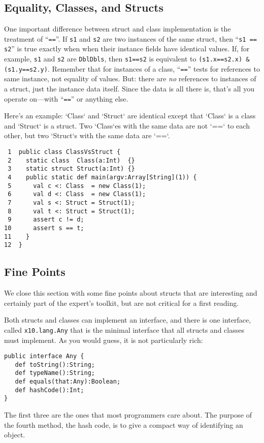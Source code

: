 \subsection{Equality, Classes, and Structs}

One important difference between struct and class
implementation is the treatment of ``{\tt ==}''.   If {\tt s1} and {\tt s2} are
two instances of the same struct, then ``{\tt s1 == s2}'' is true exactly when
when their instance fields have identical values.  If, for example, 
{\tt s1} and {\tt s2} are {\tt DblDbls}, then {\tt s1==s2}
is equivalent to {\tt (s1.x==s2.x) \& (s1.y==s2.y)}.  Remember that for
instances of a class, ``{\tt ==}'' tests for references to same instance,
not equality of values. But: there are {\em no} references to instances of a
struct, just the instance data itself.  Since the data is all there is, that's
all you operate on---with ``{\tt ==}'' or anything else.


Here's an example: \xcd`Class` and \xcd`Struct` are identical except that
\xcd`Class` is a class and \xcd`Struct` is a struct.  Two \xcd`Class`es with
the same data are not \xcd`==` to each other, but two \xcd`Struct`s with the
same data are \xcd`==`.
\begin{verbatim}
 1  public class ClassVsStruct {
 2    static class  Class(a:Int)  {}
 3    static struct Struct(a:Int) {}
 4    public static def main(argv:Array[String](1)) {
 5      val c <: Class  = new Class(1);
 6      val d <: Class  = new Class(1);
 7      val s <: Struct = Struct(1);
 8      val t <: Struct = Struct(1);
 9      assert c != d;
10      assert s == t;
11    }
12  }
\end{verbatim}

\subsection{Fine Points}

We close this section with some fine points about structs that are interesting
and certainly part of the expert's toolkit, but are not critical for a first
reading.

\label{ssec:wasacs}
Both structs and classes can implement an interface, and there is one interface,
called {\tt x10.lang.Any} that is the minimal interface that all structs and
classes must implement.  As you would guess, it is not particularly rich:
\begin{verbatim}
public interface Any {
   def toString():String;
   def typeName():String;
   def equals(that:Any):Boolean;
   def hashCode():Int;
}
\end{verbatim}
The first three are the ones that most programmers care about.  The purpose of
the fourth method, the hash code, is to give a compact way of identifying an
object.

